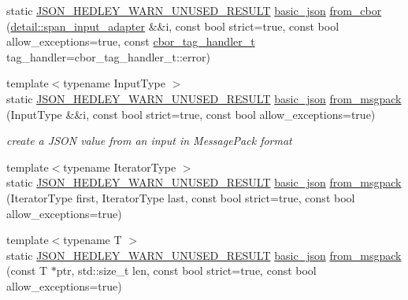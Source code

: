 \begin{DoxyCompactItemize}
\item 
static \hyperlink{json_8hpp_a28d7e3b2d26bd5b8a3806da3db7dea03}{J\+S\+O\+N\+\_\+\+H\+E\+D\+L\+E\+Y\+\_\+\+W\+A\+R\+N\+\_\+\+U\+N\+U\+S\+E\+D\+\_\+\+R\+E\+S\+U\+LT} \hyperlink{classnlohmann_1_1basic__json}{basic\+\_\+json} \hyperlink{classnlohmann_1_1basic__json_a4a67e47f4bcde55214475f47f8314c1f}{from\+\_\+cbor} (\hyperlink{classnlohmann_1_1detail_1_1span__input__adapter}{detail\+::span\+\_\+input\+\_\+adapter} \&\&i, const bool strict=true, const bool allow\+\_\+exceptions=true, const \hyperlink{namespacenlohmann_1_1detail_a58bb1ef1a9ad287a9cfaf1855784d9ac}{cbor\+\_\+tag\+\_\+handler\+\_\+t} tag\+\_\+handler=cbor\+\_\+tag\+\_\+handler\+\_\+t\+::error)
\item 
{\footnotesize template$<$typename Input\+Type $>$ }\\static \hyperlink{json_8hpp_a28d7e3b2d26bd5b8a3806da3db7dea03}{J\+S\+O\+N\+\_\+\+H\+E\+D\+L\+E\+Y\+\_\+\+W\+A\+R\+N\+\_\+\+U\+N\+U\+S\+E\+D\+\_\+\+R\+E\+S\+U\+LT} \hyperlink{classnlohmann_1_1basic__json}{basic\+\_\+json} \hyperlink{classnlohmann_1_1basic__json_adbcab52fca1e25b3311ef14e71a57590}{from\+\_\+msgpack} (Input\+Type \&\&i, const bool strict=true, const bool allow\+\_\+exceptions=true)
\begin{DoxyCompactList}\small\item\em create a J\+S\+ON value from an input in Message\+Pack format \end{DoxyCompactList}\item 
{\footnotesize template$<$typename Iterator\+Type $>$ }\\static \hyperlink{json_8hpp_a28d7e3b2d26bd5b8a3806da3db7dea03}{J\+S\+O\+N\+\_\+\+H\+E\+D\+L\+E\+Y\+\_\+\+W\+A\+R\+N\+\_\+\+U\+N\+U\+S\+E\+D\+\_\+\+R\+E\+S\+U\+LT} \hyperlink{classnlohmann_1_1basic__json}{basic\+\_\+json} \hyperlink{classnlohmann_1_1basic__json_a94dbeb08bcd13821512957dcbf3f00bd}{from\+\_\+msgpack} (Iterator\+Type first, Iterator\+Type last, const bool strict=true, const bool allow\+\_\+exceptions=true)
\item 
{\footnotesize template$<$typename T $>$ }\\static \hyperlink{json_8hpp_a28d7e3b2d26bd5b8a3806da3db7dea03}{J\+S\+O\+N\+\_\+\+H\+E\+D\+L\+E\+Y\+\_\+\+W\+A\+R\+N\+\_\+\+U\+N\+U\+S\+E\+D\+\_\+\+R\+E\+S\+U\+LT} \hyperlink{classnlohmann_1_1basic__json}{basic\+\_\+json} \hyperlink{classnlohmann_1_1basic__json_a0d69d3102639759d5202a6f764760d23}{from\+\_\+msgpack} (const T $\ast$ptr, std\+::size\+\_\+t len, const bool strict=true, const bool allow\+\_\+exceptions=true)

\end{DoxyCompactItemize}
